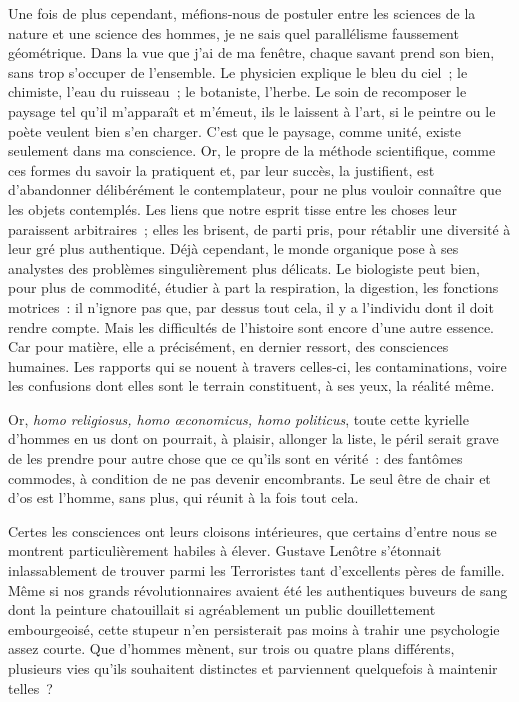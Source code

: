 \documentclass[french,twoside]{book} %
\begin{document}
\label{p76} Une fois de plus cependant, méfions‑nous de postuler entre les sciences de la nature et une science des hommes, je ne sais quel parallélisme faus­sement géométrique. Dans la vue que j’ai de ma fenêtre, chaque savant prend son bien, sans trop s’occuper de l’ensemble. Le physicien explique le bleu du ciel ; le chimiste, l’eau du ruisseau ; le botaniste, l’herbe. Le soin de recomposer le paysage tel qu’il m’apparaît et m’émeut, ils le laissent à l’art, si le peintre ou le poète veulent bien s’en charger. C’est que le paysage, comme unité, existe seulement dans ma conscience. Or, le propre de la méthode scientifique, comme ces formes du savoir la pra­tiquent et, par leur succès, la justifient, est d’abandonner délibérément le contemplateur, pour ne plus vouloir connaître que les objets contemplés. Les liens que notre esprit tisse entre les choses leur paraissent arbitraires ; elles les brisent, de parti pris, pour rétablir une diversité à leur gré plus authentique. Déjà cependant, le monde organique pose à ses analystes des problèmes singulièrement plus délicats. Le biologiste peut bien, pour plus de commodité, étudier à part la respiration, la digestion, les fonctions motrices : il n’ignore pas que, par dessus tout cela, il y a l’individu dont il doit rendre compte. Mais les difficultés de l’histoire sont encore d’une autre essence. Car pour matière, elle a précisément, en dernier ressort, des consciences humaines. Les rapports qui se nouent à travers celles‑ci, les contaminations, voire les confusions dont elles sont le terrain cons­tituent, à ses yeux, la réalité même.\par
Or, \emph{homo religiosus, homo œconomicus, homo politicus}, toute cette kyrielle d’hommes en us dont on pourrait, à plaisir, allonger la liste, le péril serait grave de les prendre pour autre chose que ce qu’ils sont en vérité : des fantômes commodes, à condition de ne pas devenir encombrants. Le seul être de chair et d’os est l’homme, sans plus, qui réunit à la fois tout cela.\par
Certes les consciences ont leurs cloisons intérieures, que certains d’entre nous se montrent particulièrement habiles à élever. Gustave Lenôtre s’étonnait inlassablement de trouver parmi les Terroristes tant d’excel­lents pères de famille. Même si nos grands révolutionnaires avaient été les authentiques buveurs de sang dont la peinture chatouillait si agréa­blement un public douillettement embourgeoisé, cette stupeur n’en per­sisterait pas moins à trahir une psychologie assez courte. Que d’hommes mènent, sur trois ou quatre plans différents, plusieurs vies qu’ils souhaitent distinctes et parviennent quelquefois à maintenir telles ?\par
\end{document}
